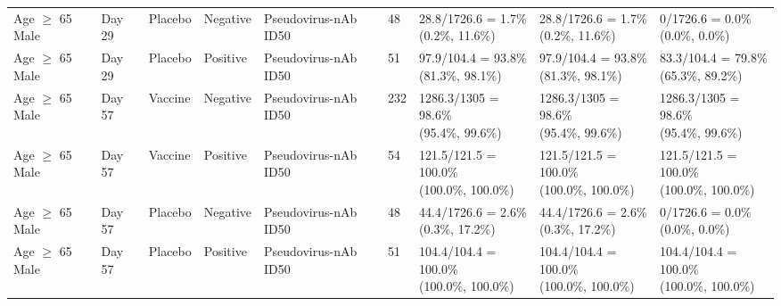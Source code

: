 \documentclass[]{book}
\theoremstyle{definition}
\theoremstyle{definition}
\theoremstyle{definition}
\newcommand{\1}{\mathbbm{1}}
\begin{document}
\begin{landscape}
\begin{ThreePartTable}
\begin{longtable}[t]{>{\raggedright\arraybackslash}p{2.7cm}llllllll}
\hspace{1em}Age $\geq$ 65 Male & Day 29 & Placebo & Negative & Pseudovirus-nAb ID50 & 48 & \makecell[l]{28.8/1726.6 = 1.7\%\\(0.2\%, 11.6\%)} & \makecell[l]{28.8/1726.6 = 1.7\%\\(0.2\%, 11.6\%)} & \makecell[l]{0/1726.6 = 0.0\%\\(0.0\%, 0.0\%)}\\
\hspace{1em}Age $\geq$ 65 Male & Day 29 & Placebo & Positive & Pseudovirus-nAb ID50 & 51 & \makecell[l]{97.9/104.4 = 93.8\%\\(81.3\%, 98.1\%)} & \makecell[l]{97.9/104.4 = 93.8\%\\(81.3\%, 98.1\%)} & \makecell[l]{83.3/104.4 = 79.8\%\\(65.3\%, 89.2\%)}\\
\hspace{1em}Age $\geq$ 65 Male & Day 57 & Vaccine & Negative & Pseudovirus-nAb ID50 & 232 & \makecell[l]{1286.3/1305 = 98.6\%\\(95.4\%, 99.6\%)} & \makecell[l]{1286.3/1305 = 98.6\%\\(95.4\%, 99.6\%)} & \makecell[l]{1286.3/1305 = 98.6\%\\(95.4\%, 99.6\%)}\\
\hspace{1em}Age $\geq$ 65 Male & Day 57 & Vaccine & Positive & Pseudovirus-nAb ID50 & 54 & \makecell[l]{121.5/121.5 = 100.0\%\\(100.0\%, 100.0\%)} & \makecell[l]{121.5/121.5 = 100.0\%\\(100.0\%, 100.0\%)} & \makecell[l]{121.5/121.5 = 100.0\%\\(100.0\%, 100.0\%)}\\
\hspace{1em}Age $\geq$ 65 Male & Day 57 & Placebo & Negative & Pseudovirus-nAb ID50 & 48 & \makecell[l]{44.4/1726.6 = 2.6\%\\(0.3\%, 17.2\%)} & \makecell[l]{44.4/1726.6 = 2.6\%\\(0.3\%, 17.2\%)} & \makecell[l]{0/1726.6 = 0.0\%\\(0.0\%, 0.0\%)}\\
\hspace{1em}Age $\geq$ 65 Male & Day 57 & Placebo & Positive & Pseudovirus-nAb ID50 & 51 & \makecell[l]{104.4/104.4 = 100.0\%\\(100.0\%, 100.0\%)} & \makecell[l]{104.4/104.4 = 100.0\%\\(100.0\%, 100.0\%)} & \makecell[l]{104.4/104.4 = 100.0\%\\(100.0\%, 100.0\%)}\\

\end{longtable}
\end{ThreePartTable}
\end{landscape}
\end{document}
